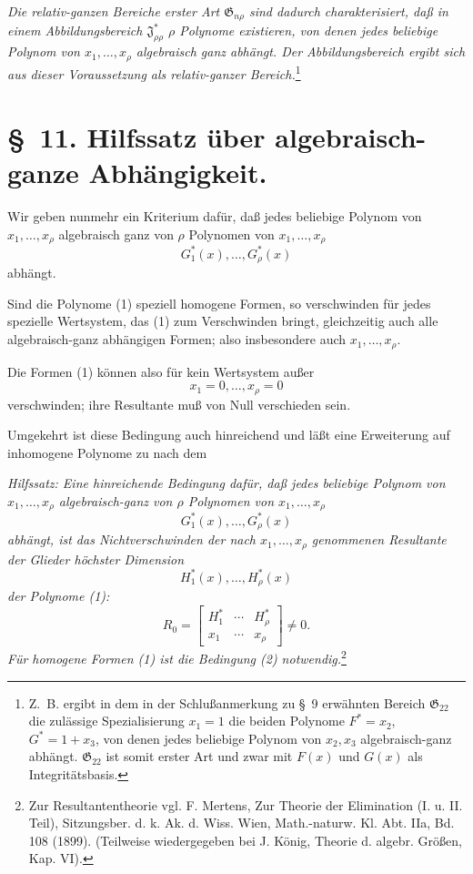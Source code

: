 \documentclass[11pt]{article}
\providecommand{\Jdom}{\mathfrak{J}}
\providecommand{\Gdom}{\mathfrak{G}}
\begin{document}
\emph{Die relativ-ganzen Bereiche erster Art $\Gdom_{n\rho}$ sind dadurch charakterisiert, daß in einem Abbildungsbereich $\Jdom^*_{\rho\rho}$ $\rho$ Polynome existieren, von denen jedes beliebige Polynom von $x_1,
\ldots,x_\rho$ algebraisch ganz abhängt. Der Abbildungsbereich ergibt sich aus dieser Voraussetzung als relativ-ganzer Bereich.}\footnote{Z.~B. ergibt in dem in der Schlußanmerkung zu \S\ 9 erwähnten Bereich $\Gdom_{22}$ die zulässige Spezialisierung $x_1=1$ die beiden Polynome $F^*=x_2$, $G^*=1+x_3$, von denen jedes beliebige Polynom von $x_2,x_3$ algebraisch-ganz abhängt. $\Gdom_{22}$ ist somit erster Art und zwar mit $F(x)$ und $G(x)$ als Integritätsbasis.}

\section*{\S\ 11. Hilfssatz über algebraisch-ganze Abhängigkeit.}

Wir geben nunmehr ein Kriterium dafür, daß jedes beliebige Polynom von $x_1,
\ldots,x_\rho$ algebraisch ganz von $\rho$ Polynomen von $x_1,
\ldots,x_\rho$
\begin{equation}
  G_1^*(x),\ldots,G_\rho^*(x)
\tag{1}
\end{equation}
abhängt.

Sind die Polynome (1) speziell homogene Formen, so verschwinden für jedes spezielle Wertsystem, das (1) zum Verschwinden bringt, gleichzeitig auch alle algebraisch-ganz abhängigen Formen; also insbesondere auch $x_1,
\ldots,x_\rho$.

Die Formen (1) können also für kein Wertsystem außer
\[
  x_1=0,
  \ldots,
  x_\rho=0
\]
verschwinden; ihre Resultante muß von Null verschieden sein.

Umgekehrt ist diese Bedingung auch hinreichend und läßt eine Erweiterung auf inhomogene Polynome zu nach dem

\emph{Hilfssatz: Eine hinreichende Bedingung dafür, daß jedes beliebige Polynom von $x_1,
\ldots,x_\rho$ algebraisch-ganz von $\rho$ Polynomen von $x_1,
\ldots,x_\rho$
\[
  G_1^*(x),\ldots,G_\rho^*(x)
\]
abhängt, ist das Nichtverschwinden der nach $x_1,
\ldots,x_\rho$ genommenen Resultante der Glieder höchster Dimension}
\[
  H_1^*(x),\ldots,H_\rho^*(x)
\]
\emph{der Polynome (1):}
\begin{equation}
  R_0=\left[
  \begin{array}{ccc}
    H_1^*&\cdots&H_\rho^*\\
    x_1&\cdots&x_\rho
  \end{array}
  \right]\ne0.
\tag{2}
\end{equation}
\emph{Für homogene Formen (1) ist die Bedingung (2) notwendig.}\footnote{Zur Resultantentheorie vgl. F. Mertens, Zur Theorie der Elimination (I. u. II. Teil), Sitzungsber. d. k. Ak. d. Wiss. Wien, Math.-naturw. Kl. Abt. IIa, Bd. 108 (1899). (Teilweise wiedergegeben bei J. König, Theorie d. algebr. Größen, Kap. VI).}
\end{document}
